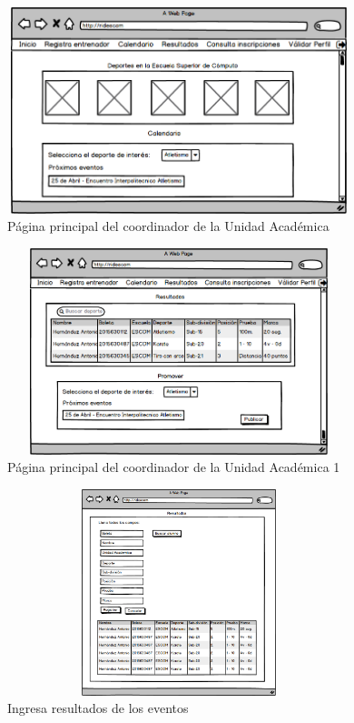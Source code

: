		\begin{figure}[hbt!]
			\centering
			\includegraphics[width=10cm, height=6cm]{Imagenes/Disenos/p9InicioCoordUA.png}
			\caption{Página principal del coordinador de la Unidad Académica}
			\label{IniciogeneralcoordUA}
		\end{figure}
			\pagebreak
	
		\begin{figure}[hbt!]
			\centering
			\includegraphics[width=10cm, height=6cm]{Imagenes/Disenos/p10InicioCoordUA1.png}
			\caption{Página principal del coordinador de la Unidad Académica 1}
			\label{IniciogeneralcoordUA1}
		\end{figure}
	
		\begin{figure}[hbt!]
			\centering
			\includegraphics[width=10cm, height=6cm]{Imagenes/Disenos/p11Ingresaresultados.png}
			\caption{Ingresa resultados de los eventos}
			\label{Ingresaresultados}
		\end{figure}
	
